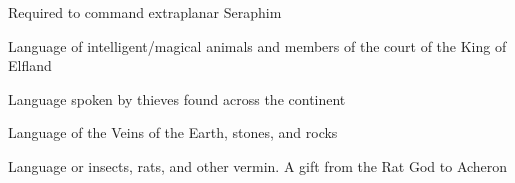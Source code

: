 {Required to command extraplanar Seraphim


Language of intelligent/magical animals and members of the court of the King of Elfland


Language spoken by thieves found across the continent


Language of the Veins of the Earth, stones, and rocks


Language or insects, rats, and other vermin. A gift from the Rat God to Acheron


} %
